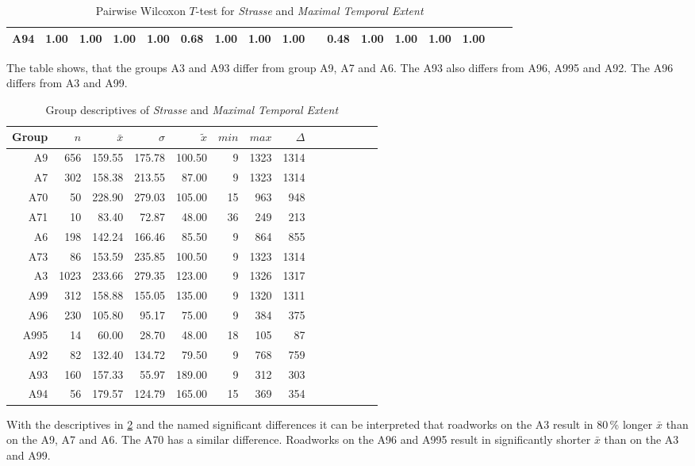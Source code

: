 \begin{table}[ht!]
\begin{tabular}{rrrrrrrrrrrrrrrrr}
		A94  & 1.00 & 1.00 & 1.00 & 1.00 & 0.68 & 1.00 & 1.00 & 1.00 & \red{0.01} & 0.48 & 1.00 & 1.00 & 1.00 & 1.00 &  &  \\ 
		\bottomrule
	\end{tabular}
	\caption{Pairwise Wilcoxon $T$-test for \textit{Strasse} and \textit{Maximal Temporal Extent}}
	\label{tbl:wilcoxon_arbis_matched_Strasse_TMax}
\end{table}
The table shows, that the groups A3 and A93 differ from group A9, A7 and A6. The A93 also differs from A96, A995 and A92. The A96 differs from A3 and A99.
\begin{table}[ht!]
	\tiny
	\centering
  \begin{tabular}{rrrrrrrrrrrrrr}
    \toprule
    Group & $n$ & $\bar{x}$ & $\sigma$ & $\tilde{x}$ & $min$ & $max$ & $\Delta$ \\
    \midrule
    A9   & 656  & 159.55 & 175.78 & 100.50 & 9   & 1323 & 1314 \\ 
    A7   & 302  & 158.38 & 213.55 & 87.00  & 9   & 1323 & 1314 \\ 
    A70  & 50   & 228.90 & 279.03 & 105.00 & 15  & 963  & 948 \\ 
    A71  & 10   & 83.40  & 72.87  & 48.00  & 36  & 249  & 213 \\ 
    A6   & 198  & 142.24 & 166.46 & 85.50  & 9   & 864  & 855 \\ 
    A73  & 86   & 153.59 & 235.85 & 100.50 & 9   & 1323 & 1314 \\ 
    A3   & 1023 & 233.66 & 279.35 & 123.00 & 9   & 1326 & 1317 \\ 
    A99  & 312  & 158.88 & 155.05 & 135.00 & 9   & 1320 & 1311 \\ 
    A96  & 230  & 105.80 & 95.17  & 75.00  & 9   & 384  & 375 \\ 
    A995 & 14   & 60.00  & 28.70  & 48.00  & 18  & 105  & 87 \\ 
    A92  & 82   & 132.40 & 134.72 & 79.50  & 9   & 768  & 759 \\ 
    A93  & 160  & 157.33 & 55.97  & 189.00 & 9   & 312  & 303 \\  
    A94  & 56   & 179.57 & 124.79 & 165.00 & 15  & 369  & 354 \\ 
    \bottomrule
  \end{tabular}
	\caption{Group descriptives of \textit{Strasse} and \textit{Maximal Temporal Extent}}
	\label{tbl:descriptives_arbis_matched_Strasse_TMax}
\end{table}
With the descriptives in \cref{tbl:descriptives_arbis_matched_Strasse_TMax} and the named significant differences it can be interpreted that roadworks on the A3 result in 80\,\% longer $\bar{x}$ than on the A9, A7 and A6. The A70 has a similar difference. Roadworks on the A96 and A995 result in significantly shorter $\bar{x}$ than on the A3 and A99.

